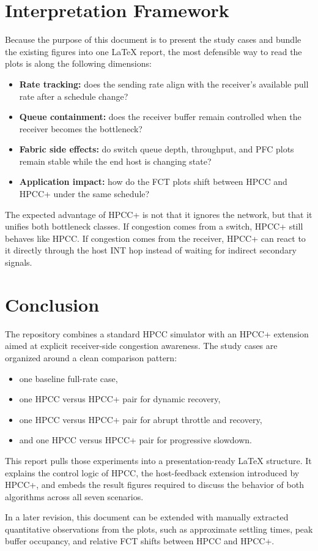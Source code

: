 \documentclass[11pt,a4paper]{article}
\begin{document}
\section{Interpretation Framework}

Because the purpose of this document is to present the study cases and bundle the existing figures into one LaTeX report, the most defensible way to read the plots is along the following dimensions:

\begin{itemize}
    \item \textbf{Rate tracking:} does the sending rate align with the receiver's available pull rate after a schedule change?
    \item \textbf{Queue containment:} does the receiver buffer remain controlled when the receiver becomes the bottleneck?
    \item \textbf{Fabric side effects:} do switch queue depth, throughput, and PFC plots remain stable while the end host is changing state?
    \item \textbf{Application impact:} how do the FCT plots shift between HPCC and HPCC+ under the same schedule?
\end{itemize}

The expected advantage of HPCC+ is not that it ignores the network, but that it unifies both bottleneck classes. If congestion comes from a switch, HPCC+ still behaves like HPCC. If congestion comes from the receiver, HPCC+ can react to it directly through the host INT hop instead of waiting for indirect secondary signals.

\section{Conclusion}

The repository combines a standard HPCC simulator with an HPCC+ extension aimed at explicit receiver-side congestion awareness. The study cases are organized around a clean comparison pattern:

\begin{itemize}
    \item one baseline full-rate case,
    \item one HPCC versus HPCC+ pair for dynamic recovery,
    \item one HPCC versus HPCC+ pair for abrupt throttle and recovery,
    \item and one HPCC versus HPCC+ pair for progressive slowdown.
\end{itemize}

This report pulls those experiments into a presentation-ready LaTeX structure. It explains the control logic of HPCC, the host-feedback extension introduced by HPCC+, and embeds the result figures required to discuss the behavior of both algorithms across all seven scenarios.

In a later revision, this document can be extended with manually extracted quantitative observations from the plots, such as approximate settling times, peak buffer occupancy, and relative FCT shifts between HPCC and HPCC+.
\end{document}
